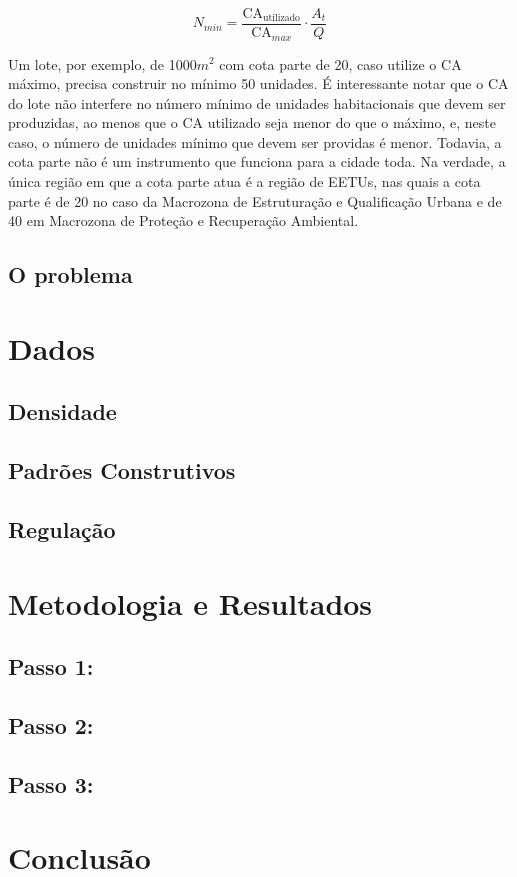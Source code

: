 \begin{equation}
    N_{min} = \frac{\text{CA}_{\text{utilizado}}}{\text{CA}_{max}}\cdot \frac{A_t}{Q}
    \label{eq:cotaparte}
\end{equation}

Um lote, por exemplo, de 1000$m^2$ com cota parte de 20, caso utilize o CA máximo, precisa construir no mínimo 50 unidades. É interessante notar que o CA do lote não interfere no número mínimo de unidades habitacionais que devem ser produzidas, ao menos que o CA utilizado seja menor do que o máximo, e, neste caso, o número de unidades mínimo que devem ser providas é menor. Todavia, a cota parte não é um instrumento que funciona para a cidade toda. Na verdade, a única região em que a cota parte atua é a região de EETUs, nas quais a cota parte é de 20 no caso da Macrozona de Estruturação e Qualificação Urbana e de 40 em Macrozona de Proteção e Recuperação Ambiental.



\section{O problema}

\chapter{Dados}

\section{Densidade}
\section{Padrões Construtivos}
\section{Regulação}

\chapter{Metodologia e Resultados}

\section{Passo 1: }
\section{Passo 2: }
\section{Passo 3: }

\chapter{Conclusão}